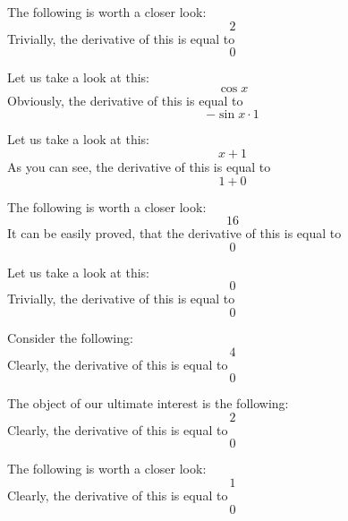 \documentclass{article}
\begin{document}
The following is worth a closer look:
\begin{equation}
2 
\end{equation}
Trivially, the derivative of this is equal to
\begin{equation}
0 
\end{equation}

Let us take a look at this:
\begin{equation}
\cos x 
\end{equation}
Obviously, the derivative of this is equal to
\begin{equation}
-\sin x \cdot 1 
\end{equation}

Let us take a look at this:
\begin{equation}
x + 1 
\end{equation}
As you can see, the derivative of this is equal to
\begin{equation}
1 + 0 
\end{equation}

The following is worth a closer look:
\begin{equation}
16 
\end{equation}
It can be easily proved, that the derivative of this is equal to
\begin{equation}
0 
\end{equation}

Let us take a look at this:
\begin{equation}
0 
\end{equation}
Trivially, the derivative of this is equal to
\begin{equation}
0 
\end{equation}

Consider the following:
\begin{equation}
4 
\end{equation}
Clearly, the derivative of this is equal to
\begin{equation}
0 
\end{equation}

The object of our ultimate interest is the following:
\begin{equation}
2 
\end{equation}
Clearly, the derivative of this is equal to
\begin{equation}
0 
\end{equation}

The following is worth a closer look:
\begin{equation}
1 
\end{equation}
Clearly, the derivative of this is equal to
\begin{equation}
0 
\end{equation}
\end{document}
